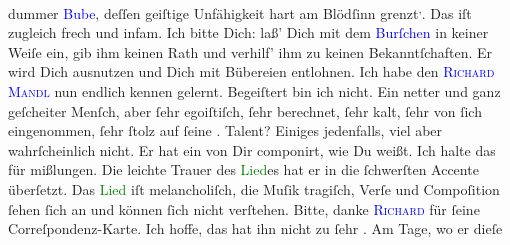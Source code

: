                dummer \textcolor{blue}{Bube}{},  deſſen geiſtige Unfähigkeit
               hart am Blödſinn grenzt\substVorne{}\textsuperscript{,}\substDazwischen{}.\substHinten{} Das iſt zugleich frech und infam. Ich bitte Dich: laß’ Dich mit dem \textcolor{blue}{Burſchen}{} in keiner Weiſe ein,
               gib ihm keinen Rath und verhilf’ ihm zu  keinen
               Bekanntſchaften. {\pb}Er wird Dich ausnutzen und Dich
               mit Bübereien entlohnen. {\dotsfour}\pend
           \pstart
           Ich habe den \textsc{\textcolor{blue}{Richard Mandl}{}\ledrightnote{\textcolor{blue}{Richard Mandl}}} nun endlich kennen gelernt. Begeiſtert bin ich nicht. Ein netter und ganz
               geſcheiter Menſch, aber ſehr egoiſtiſch, ſehr berechnet, ſehr kalt, ſehr von ſich
               eingenommen, ſehr ſtolz auf ſeine \label{K_L02778-4v}\label{K_L02778-4h}. Talent? Einiges jedenfalls, {\pb}viel aber wahrſcheinlich nicht. Er hat ein \label{K_L02778-7v}\label{K_L02778-7h} von Dir componirt, wie Du weißt. Ich halte das für
               mißlungen. Die leichte Trauer des \textcolor{green}{Lied}{}es hat er in die ſchwerſten Accente überſetzt. Das \textcolor{green}{Lied}{} iſt melancholiſch, die Muſik tragiſch,
               Verſe und Compoſition ſehen ſich an und können ſich nicht verſtehen.\pend
           \pstart
           Bitte, danke \textsc{\textcolor{blue}{Richard}{}\ledrightnote{\textcolor{blue}{Richard Beer-Hofmann}}} für ſeine Correſpondenz-{\pb}Karte. Ich hoffe, das
               hat ihn nicht zu ſehr \label{K_L02778-88v}\label{K_L02778-88h}. Am Tage, wo er dieſe
